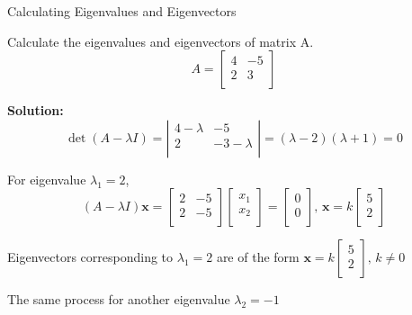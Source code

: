 \documentclass{beamer}
\begin{document}
\begin{frame}{Calculating Eigenvalues and Eigenvectors}
\begin{examples}
Calculate the eigenvalues and eigenvectors of matrix A.
\begin{equation*}
    A=\left[ \begin{matrix}
	4&		-5\\
	2&		3\\
\end{matrix} \right]
\end{equation*}
\end{examples}
\textbf{Solution:}
\begin{equation*}
    \det \left( A-\lambda I \right) =\left| \begin{matrix}
	4-\lambda&		-5\\
	2&		-3-\lambda\\
\end{matrix} \right|=\left( \lambda -2 \right) \left( \lambda +1 \right) =0
\end{equation*}

For eigenvalue $\lambda_1=2$,
\begin{equation*}
    \left( A-\lambda I \right) \mathbf{x}=\left[ \begin{matrix}
	2&		-5\\
	2&		-5\\
\end{matrix} \right] \left[ \begin{array}{c}
	x_1\\
	x_2\\
\end{array} \right] =\left[ \begin{array}{c}
	0\\
	0\\
\end{array} \right] , \, \mathbf{x}=k\left[ \begin{array}{c}
	5\\
	2\\
\end{array} \right]
\end{equation*}

Eigenvectors corresponding to $\lambda_1=2$ are of the form $\mathbf{x}=k\left[ \begin{array}{c}
	5\\
	2\\
\end{array} \right],\,k\ne 0$

The same process for another eigenvalue $\lambda_2=-1$
\end{frame}
\end{document}
